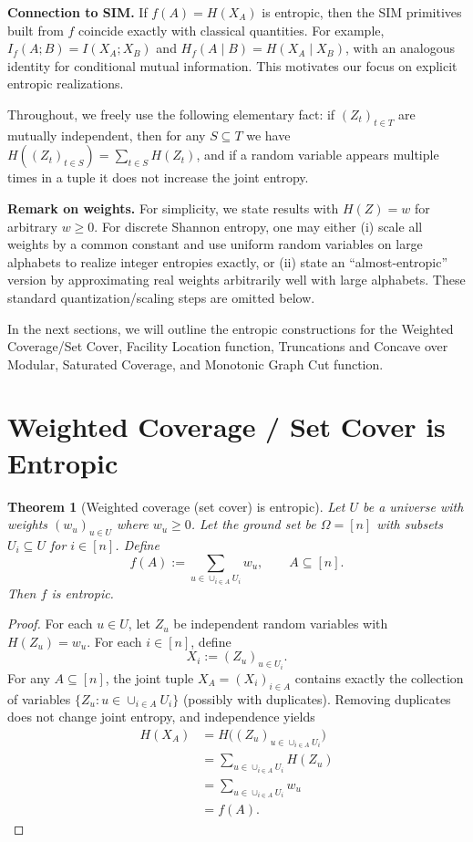 \documentclass[conference]{IEEEtran}
\newtheorem{theorem}{Theorem}
\theoremstyle{definition}
\theoremstyle{remark}
\begin{document}
\noindent\textbf{Connection to SIM.}
If $f(A)=H(X_A)$ is entropic, then the SIM primitives built from $f$ coincide exactly with classical quantities.
For example, $I_f(A;B)=I(X_A;X_B)$ and $H_f(A\mid B)=H(X_A\mid X_B)$, with an analogous identity for conditional mutual
information. This motivates our focus on explicit entropic realizations.

Throughout, we freely use the following elementary fact: if $(Z_t)_{t\in T}$ are mutually independent,
then for any $S\subseteq T$ we have $H((Z_t)_{t\in S})=\sum_{t\in S}H(Z_t)$, and if a random variable
appears multiple times in a tuple it does not increase the joint entropy.

\vspace{0.3em}
\noindent\textbf{Remark on weights.}
For simplicity, we state results with $H(Z)=w$ for arbitrary $w\ge 0$. For discrete Shannon entropy,
one may either (i) scale all weights by a common constant and use uniform random variables on large alphabets
to realize integer entropies exactly, or (ii) state an ``almost-entropic'' version by approximating real
weights arbitrarily well with large alphabets. These standard quantization/scaling steps are omitted below.

In the next sections, we will outline the entropic constructions for the Weighted Coverage/Set Cover, Facility Location function, Truncations and Concave over Modular, Saturated Coverage, and Monotonic Graph Cut function. 

\section{Weighted Coverage / Set Cover is Entropic} \label{sec:set_cover}


\begin{theorem}[Weighted coverage (set cover) is entropic]
\label{thm:coverage_entropic}
Let $U$ be a universe with weights $(w_u)_{u\in U}$ where $w_u\ge 0$. Let the ground set be $\Omega=[n]$
with subsets $U_i\subseteq U$ for $i\in[n]$. Define
\[
f(A) := \sum_{u\in \cup_{i\in A} U_i} w_u,\qquad A\subseteq [n].
\]
Then $f$ is entropic.
\end{theorem}

\begin{proof}
For each $u\in U$, let $Z_u$ be independent random variables with $H(Z_u)=w_u$.
For each $i\in[n]$, define
\[
X_i := (Z_u)_{u\in U_i}.
\]
For any $A\subseteq[n]$, the joint tuple $X_A=(X_i)_{i\in A}$ contains exactly the collection of variables
$\{Z_u: u\in \cup_{i\in A}U_i\}$ (possibly with duplicates). Removing duplicates does not change joint entropy,
and independence yields
\begin{align}
H(X_A) &=H\big((Z_u)_{u\in \cup_{i\in A}U_i}\big) \nonumber \\
&=\sum_{u\in \cup_{i\in A}U_i} H(Z_u) \nonumber \\
&=\sum_{u\in \cup_{i\in A}U_i} w_u \nonumber \\ &=f(A).
\end{align}
\end{proof}
\end{document}
